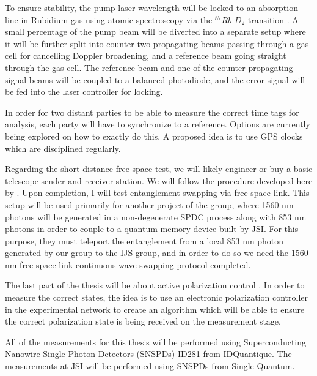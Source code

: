 \documentclass{article}
\theoremstyle{mytheoremstyle}
\theoremstyle{mytheoremstyle}
\theoremstyle{myproblemstyle}
\begin{document}
To ensure stability, the pump laser wavelength will be locked to an absorption line in Rubidium gas using atomic spectroscopy
via the $^{87}Rb$ $D_2$ transition \cite{metger2017sas}. A small percentage of the pump beam will be diverted into a separate
setup where it will be further split into counter two propagating beams passing through a gas cell for cancelling Doppler broadening,
and a reference beam going straight through the gas cell. The reference beam and one of the counter propagating signal beams will be
coupled to a balanced photodiode, and the error signal will be fed into the laser controller for locking.

In order for two distant parties to be able to measure the correct time tags for analysis, each party will have to synchronize
to a reference. Options are currently being explored on how to exactly do this. A proposed idea is to use GPS clocks which are disciplined
regularly.

Regarding the short distance free space test, we will likely engineer or buy a basic telescope sender and receiver station.
We will follow the procedure developed here by \cite{Gross_Jena}. Upon completion, I will test entanglement swapping via free space
link. This setup will be used primarily for another project of the group, where 1560 nm photons will be generated in a non-degenerate SPDC process
along with 853 nm photons in order to couple to a quantum memory device built by JSI. For this purpose, they must teleport the entanglement from a local 853 nm photon
generated by our group to the IJS group, and in order to do so we need the 1560 nm free space link continuous wave swapping protocol completed.

The last part of the thesis will be about active polarization control %
\cite{CCSHDCDRS}. In order to measure the correct states, the
idea is to use an electronic polarization controller in the experimental network to create an algorithm which will be able to
ensure the correct polarization state is being received on the measurement stage.

All of the measurements for this thesis will be performed using Superconducting Nanowire Single Photon Detectors (SNSPDs) ID281 from IDQuantique. The
measurements at JSI will be performed using SNSPDs from Single Quantum.
\end{document}
